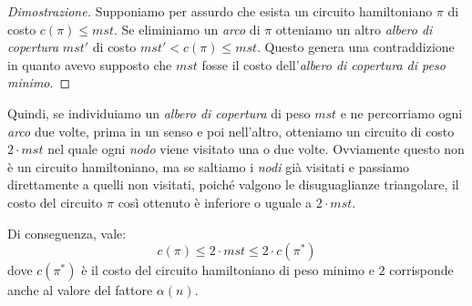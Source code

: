 \begin{proof}[Dimostrazione]
    Supponiamo per assurdo che esista un circuito hamiltoniano $\pi$ di costo
    $c(\pi)\leq mst$. Se eliminiamo un \emph{arco} di $\pi$ otteniamo un altro
    \emph{albero di copertura} $mst'$ di costo $mst'<c(\pi)\leq mst$. Questo
    genera una contraddizione in quanto avevo supposto che $mst$ fosse il costo
    dell'\emph{albero di copertura di peso minimo}.
\end{proof}

\noindent
Quindi, se individuiamo un \emph{albero di copertura} di peso $mst$ e ne
percorriamo ogni \emph{arco} due volte, prima in un senso e poi nell'altro,
otteniamo un circuito di costo $2\cdot mst$ nel quale ogni \emph{nodo} viene
visitato una o due volte. Ovviamente questo non è un circuito hamiltoniano, ma
se saltiamo i \emph{nodi} già visitati e passiamo direttamente a quelli non
visitati, poiché valgono le disuguaglianze triangolare, il costo del circuito
$\pi$ così ottenuto è inferiore o uguale a $2\cdot mst$.

\bigskip\noindent
Di conseguenza, vale:
\[c(\pi)\leq 2\cdot mst\leq 2\cdot c(\pi^*)\]
dove $c(\pi^*)$ è il costo del circuito hamiltoniano di peso minimo e $2$ corrisponde
anche al valore del fattore $\alpha(n)$.

